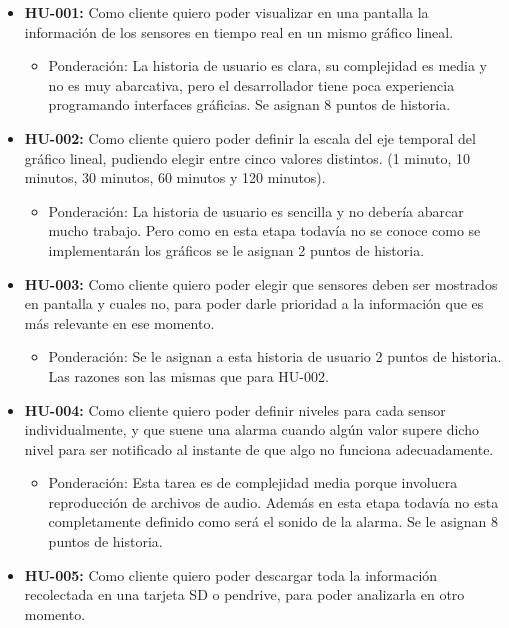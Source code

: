 \documentclass[11pt]{charter}
\begin{document}
\begin{itemize}
\item \textbf{HU-001:} Como cliente quiero poder visualizar en una pantalla la información de los sensores en tiempo real en un mismo gráfico lineal.
	\begin{itemize}
	\item Ponderación: La historia de usuario es clara, su complejidad es media y no es muy abarcativa, pero el desarrollador tiene poca experiencia programando interfaces gráficias. Se asignan 8 puntos de historia.
	\end{itemize}
\item \textbf{HU-002:} Como cliente quiero poder definir la escala del eje temporal del gráfico lineal, pudiendo elegir entre cinco valores distintos. (1 minuto, 10 minutos, 30 minutos, 60 minutos y 120 minutos).
	\begin{itemize}
	\item Ponderación: La historia de usuario es sencilla y no debería abarcar mucho trabajo. Pero como en esta etapa todavía no se conoce como se implementarán los gráficos se le asignan 2 puntos de historia.
	\end{itemize}
\item \textbf{HU-003:} Como cliente quiero poder elegir que sensores deben ser mostrados en pantalla y cuales no, para poder darle prioridad a la información que es más relevante en ese momento.
	\begin{itemize}
	\item Ponderación: Se le asignan a esta historia de usuario 2 puntos de historia. Las razones son las mismas que para HU-002.
	\end{itemize}
\item \textbf{HU-004:} Como cliente quiero poder definir niveles para cada sensor individualmente, y que suene una alarma cuando algún valor supere dicho nivel para ser notificado al instante de que algo no funciona adecuadamente.
	\begin{itemize}
	\item Ponderación: Esta tarea es de complejidad media porque involucra reproducción de archivos de audio. Además en esta etapa todavía no esta completamente definido como será el sonido de la alarma. Se le asignan 8 puntos de historia.
	\end{itemize}
\item \textbf{HU-005:} Como cliente quiero poder descargar toda la información recolectada en una tarjeta SD o pendrive, para poder analizarla en otro momento.
	\begin{itemize}

\end{itemize}
\end{itemize}
\end{document}
